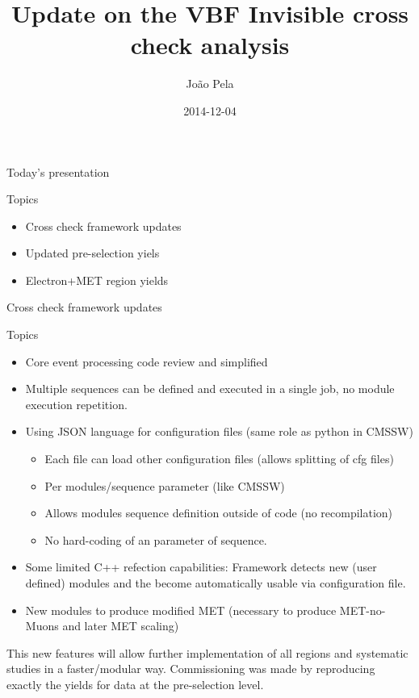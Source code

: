 \documentclass[8pt]{beamer}
\author[J. Pela]{João Pela}
\title{Update on the VBF Invisible cross check analysis}
\institute[ICL]{Imperial College London}
\date{2014-12-04}
\begin{document}
\setlength{\unitlength}{1mm}

\begin{frame}
  \titlepage
\end{frame}

\begin{frame}{Today's presentation}
 
\begin{block}{Topics}
 
\begin{itemize}
  \item Cross check framework updates
  \item Updated pre-selection yiels
  \item Electron+MET region yields 
\end{itemize}
 
\end{block}

\end{frame}

\begin{frame}{Cross check framework updates}
 
\begin{block}{Topics}
 
\begin{itemize}
  \item Core event processing code review and simplified
  \item Multiple sequences can be defined and executed in a single job, no module execution repetition.
  \item Using JSON language for configuration files (same role as python in CMSSW)
  \begin{itemize}
    \item Each file can load other configuration files (allows splitting of cfg files)
    \item Per modules/sequence parameter (like CMSSW)
    \item Allows modules sequence definition outside of code (no recompilation)
    \item No hard-coding of an parameter of sequence.
  \end{itemize}
  \item Some limited C++ refection capabilities: Framework detects new (user defined) modules and the become automatically usable via configuration file.  
  \item New modules to produce modified MET (necessary to produce MET-no-Muons and later MET scaling)
\end{itemize}

\end{block}

This new features will allow further implementation of all regions and systematic studies in a faster/modular way. Commissioning was made by reproducing exactly the yields for data at the pre-selection level. 

\end{frame}
\end{document}
